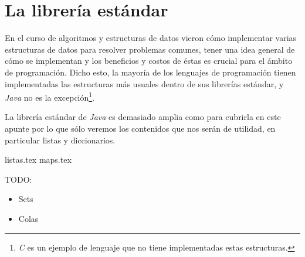 \section{La librería estándar}
  En el curso de algoritmos y estructuras de datos vieron cómo implementar varias estructuras de 
  datos para resolver problemas comunes, tener una idea general de cómo se implementan y los 
  beneficios y costos de éstas es crucial para el ámbito de programación.
  Dicho esto, la mayoría de los lenguajes de programación tienen implementadas las estructuras más
  usuales dentro de sus librerías estándar, y \textit{Java} no es la excepción\footnote{\textit{C} 
  es un ejemplo de lenguaje que no tiene implementadas estas estructuras.}.

  La librería estándar de \textit{Java} es demasiado amplia como para cubrirla en este apunte por lo
  que sólo veremos los contenidos que nos serán de utilidad, en particular listas y diccionarios.
  
  {listas.tex}
  {maps.tex}

  TODO:
  \begin{itemize}
    \item Sets
    \item Colas
  \end{itemize}